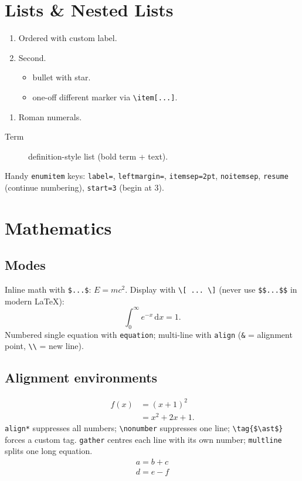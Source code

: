 \documentclass[11pt]{article}
\newcommand{\dd}{\,\mathrm{d}}         %
\theoremstyle{plain}
\theoremstyle{definition}
\theoremstyle{remark}
\begin{document}
\section{Lists \& Nested Lists}
\begin{enumerate}[label=(\alph*)]     %
  \item Ordered with custom label.
  \item Second.
    \begin{itemize}[label=$\star$]    %
      \item bullet with star.
      \item[$\oplus$] one-off different marker via \verb|\item[...]|.
    \end{itemize}
\end{enumerate}
\begin{enumerate}[label=\Roman*.]     %
  \item Roman numerals.
\end{enumerate}
\begin{description}
  \item[Term] definition-style list (bold term + text).
\end{description}
Handy \texttt{enumitem} keys: \verb|label=|, \verb|leftmargin=|,
\verb|itemsep=2pt|, \verb|noitemsep|, \verb|resume| (continue numbering),
\verb|start=3| (begin at 3).

\section{Mathematics}
\subsection{Modes}
Inline math with \verb|$...$|: $E=mc^2$.
Display with \verb|\[ ... \]| (never use \verb|$$...$$| in modern LaTeX):
\[ \int_0^\infty e^{-x}\dd x = 1. \]
Numbered single equation with \texttt{equation}; multi-line with
\texttt{align} (\verb|&| = alignment point, \verb|\\| = new line).

\subsection{Alignment environments}
\begin{align}
  f(x) &= (x+1)^2            \label{eq:cs1}\\
       &= x^2 + 2x + 1 .     \label{eq:cs2}
\end{align}
\verb|align*| suppresses all numbers; \verb|\nonumber| suppresses one line;
\verb|\tag{$\ast$}| forces a custom tag. \texttt{gather} centres each line
with its own number; \texttt{multline} splits one long equation.
\[
  \begin{gathered}         %
    a = b + c \\
    d = e - f
  \end{gathered}
\]
\end{document}
